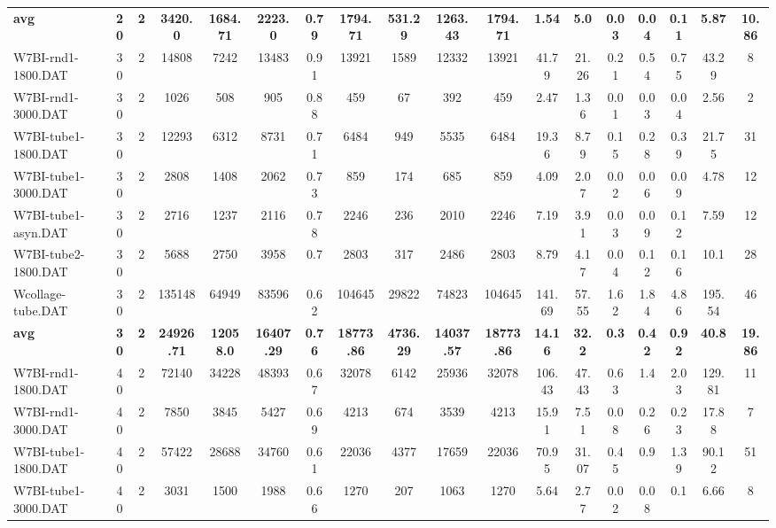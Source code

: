 \begin{sidewaystable}[h]
{\begin{tabular}{lccccccccccccccccc}
\cline{1-18} \textbf{avg} & \textbf{20} & \textbf{2} & \textbf{3420.0} & \textbf{1684.71} & \textbf{2223.0} & \textbf{0.79} & \textbf{1794.71} & \textbf{531.29} & \textbf{1263.43} & \textbf{1794.71} & \textbf{1.54} & \textbf{5.0} & \textbf{0.03} & \textbf{0.04} & \textbf{0.11} & \textbf{5.87} & \textbf{10.86} \\ \cline{1-18}
W7BI-rnd1-1800.DAT & 30 & 2 & 14808 & 7242 & 13483 & 0.91 & 13921 & 1589 & 12332 & 13921 & 41.79 & 21.26 & 0.21 & 0.54 & 0.75 & 43.29 & 8\\
W7BI-rnd1-3000.DAT & 30 & 2 & 1026 & 508 & 905 & 0.88 & 459 & 67 & 392 & 459 & 2.47 & 1.36 & 0.01 & 0.03 & 0.04 & 2.56 & 2\\
W7BI-tube1-1800.DAT & 30 & 2 & 12293 & 6312 & 8731 & 0.71 & 6484 & 949 & 5535 & 6484 & 19.36 & 8.79 & 0.15 & 0.28 & 0.39 & 21.75 & 31\\
W7BI-tube1-3000.DAT & 30 & 2 & 2808 & 1408 & 2062 & 0.73 & 859 & 174 & 685 & 859 & 4.09 & 2.07 & 0.02 & 0.06 & 0.09 & 4.78 & 12\\
W7BI-tube1-asyn.DAT & 30 & 2 & 2716 & 1237 & 2116 & 0.78 & 2246 & 236 & 2010 & 2246 & 7.19 & 3.91 & 0.03 & 0.09 & 0.12 & 7.59 & 12\\
W7BI-tube2-1800.DAT & 30 & 2 & 5688 & 2750 & 3958 & 0.7 & 2803 & 317 & 2486 & 2803 & 8.79 & 4.17 & 0.04 & 0.12 & 0.16 & 10.1 & 28\\
Wcollage-tube.DAT & 30 & 2 & 135148 & 64949 & 83596 & 0.62 & 104645 & 29822 & 74823 & 104645 & 141.69 & 57.55 & 1.62 & 1.84 & 4.86 & 195.54 & 46\\
\cline{1-18} \textbf{avg} & \textbf{30} & \textbf{2} & \textbf{24926.71} & \textbf{12058.0} & \textbf{16407.29} & \textbf{0.76} & \textbf{18773.86} & \textbf{4736.29} & \textbf{14037.57} & \textbf{18773.86} & \textbf{14.16} & \textbf{32.2} & \textbf{0.3} & \textbf{0.42} & \textbf{0.92} & \textbf{40.8} & \textbf{19.86} \\ \cline{1-18}
W7BI-rnd1-1800.DAT & 40 & 2 & 72140 & 34228 & 48393 & 0.67 & 32078 & 6142 & 25936 & 32078 & 106.43 & 47.43 & 0.63 & 1.4 & 2.03 & 129.81 & 11\\
W7BI-rnd1-3000.DAT & 40 & 2 & 7850 & 3845 & 5427 & 0.69 & 4213 & 674 & 3539 & 4213 & 15.91 & 7.51 & 0.08 & 0.26 & 0.23 & 17.88 & 7\\
W7BI-tube1-1800.DAT & 40 & 2 & 57422 & 28688 & 34760 & 0.61 & 22036 & 4377 & 17659 & 22036 & 70.95 & 31.07 & 0.45 & 0.9 & 1.39 & 90.12 & 51\\
W7BI-tube1-3000.DAT & 40 & 2 & 3031 & 1500 & 1988 & 0.66 & 1270 & 207 & 1063 & 1270 & 5.64 & 2.77 & 0.02 & 0.08 & 0.1 & 6.66 & 8\\

\end{tabular}}
\end{sidewaystable}
